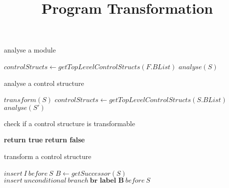 \documentclass{article}
\title{Program Transformation}
\begin{document}
\maketitle


\begin{algorithm}
  \caption{analyse a module}
  \begin{algorithmic}[1]
        \State $controlStructs \gets getTopLevelControlStructs(F.BList)$ 
          \State $analyse(S)$
        \EndFor
      \EndFor
    \EndFunction
  \end{algorithmic}
\end{algorithm}

\begin{algorithm}
  \caption{analyse a control structure}
  \begin{algorithmic}[1]
        \State $transform(S)$
      \Else
        \State $controlStructs \gets getTopLevelControlStructs(S.BList)$
          \State $analyse(S')$ 
        \EndFor
      \EndIf
    \EndFunction
  \end{algorithmic}
\end{algorithm}

\begin{algorithm}
  \caption{check if a control structure is transformable}
  \begin{algorithmic}[1]
      \State \textbf{return true}
    \Else
      \State \textbf{return false}
    \EndIf
    \EndFunction
  \end{algorithmic}
\end{algorithm}

\begin{algorithm}
  \caption{transform a control structure}
  \begin{algorithmic}[1]
           
            \State $insert\ I\ before\ S$
          \EndIf
        \EndFor
      \EndFor
      \State $B \gets getSuccessor(S)$
      \State $insert\ unconditional\ branch\ \textbf{br\ label\ B}\ before\ S$
    \EndFunction
  \end{algorithmic}
\end{algorithm}
\end{document}
